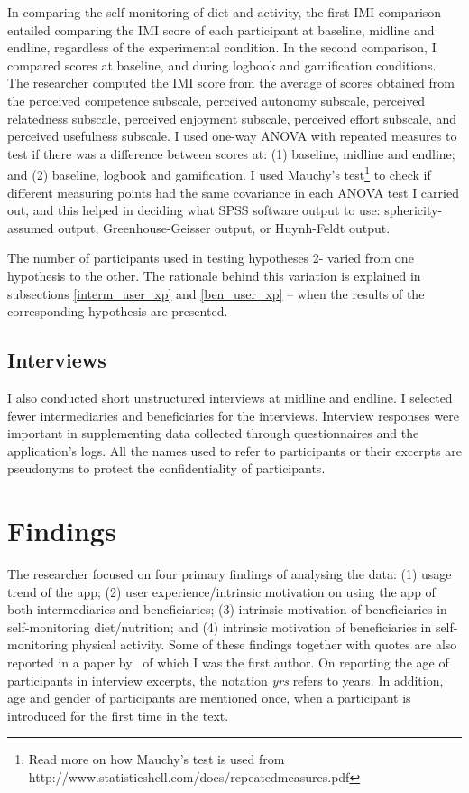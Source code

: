 In comparing the self-monitoring of diet and activity, the first IMI comparison  entailed comparing the IMI score of each participant at baseline, midline and endline, regardless of the experimental condition. In the second comparison, I compared scores at baseline, and during logbook and gamification conditions. The researcher computed the IMI score from the average of scores obtained from the perceived competence subscale, perceived autonomy subscale, perceived relatedness subscale, perceived enjoyment subscale, perceived effort subscale, and perceived usefulness subscale. I used one-way ANOVA with repeated measures to test if there was a difference  between scores at: (1) baseline, midline and endline; and (2) baseline, logbook and gamification. I used Mauchy's test\footnote{Read more on how Mauchy's test is used from http://www.statisticshell.com/docs/repeatedmeasures.pdf} to check if different measuring points had the same covariance in each ANOVA test I carried out, and this helped in deciding what SPSS software output to use: sphericity-assumed output, Greenhouse-Geisser output, or Huynh-Feldt output.

The number of participants used in testing hypotheses 2\thinspace- varied from one hypothesis to the other. The rationale behind this variation is explained in subsections \ref{interm_user_xp} and \ref{ben_user_xp} -- when the results of the corresponding hypothesis are presented.
 
\subsection{Interviews}
I also conducted short unstructured interviews at midline and endline. I selected fewer intermediaries and beneficiaries for the interviews. Interview responses were important in supplementing data collected through questionnaires and the application's logs. All the names used to refer to participants or their excerpts are pseudonyms to protect the confidentiality of participants.
\section{Findings}
The researcher focused on four primary findings of analysing the data: (1) usage trend of the app; (2) user experience/intrinsic motivation on using the app of both intermediaries and beneficiaries; (3) intrinsic motivation of beneficiaries in self-monitoring diet/nutrition; and (4) intrinsic motivation of beneficiaries in self-monitoring physical activity. Some of these findings together with quotes are also reported in a paper by~\cite{katule2016family} of which I was the first author. On reporting the age of participants in interview excerpts, the notation \emph{yrs} refers to years. In addition, age and gender of participants are mentioned once, when a participant is introduced for the first time in the text. 
